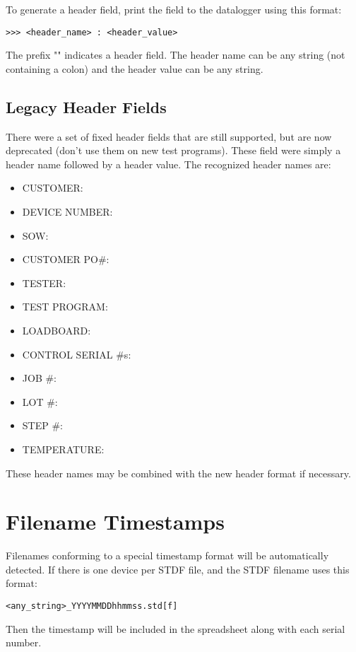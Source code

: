 \documentclass[letterpaper]{article}
\begin{document}
To generate a header field, print the field to the datalogger using this format:
\begin{verbatim}
>>> <header_name> : <header_value>
\end{verbatim}
The prefix "\gT\gT\gT" indicates a header field.  The header name can be any string (not containing a colon)
and the header value can be any string.
\clearpage
\subsection{Legacy Header Fields}
There were a set of fixed header fields that are still supported, but are now deprecated (don't use them on new test programs).
These field were simply a header name followed by a header value.  The recognized header names
are:
\begin{itemize}
\item CUSTOMER:
\item DEVICE NUMBER:
\item SOW:
\item CUSTOMER PO\#:
\item TESTER:
\item TEST PROGRAM:
\item LOADBOARD:
\item CONTROL SERIAL \#s:
\item JOB \#:
\item LOT \#:
\item STEP \#:
\item TEMPERATURE:
\end{itemize}

These header names may be combined with the new header format if necessary.

\section{Filename Timestamps}
Filenames conforming to a special timestamp format will be automatically detected. 
If there is one device per STDF file, and the STDF filename uses this format:
\begin{verbatim}
<any_string>_YYYYMMDDhhmmss.std[f]
\end{verbatim}
Then the timestamp will be included in the spreadsheet along with each serial number.
\end{document}
